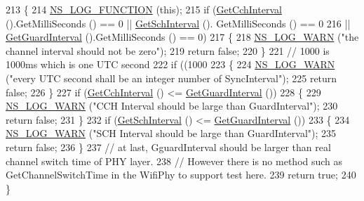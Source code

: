 \begin{DoxyCode}
213 \{
214   \hyperlink{log-macros-disabled_8h_a90b90d5bad1f39cb1b64923ea94c0761}{NS\_LOG\_FUNCTION} (\textcolor{keyword}{this});
215   \textcolor{keywordflow}{if} (\hyperlink{classns3_1_1ChannelCoordinator_a9716fda402d8768bf5488e7471c41eff}{GetCchInterval} ().GetMilliSeconds () == 0 || \hyperlink{classns3_1_1ChannelCoordinator_ac746b747df6aa82985ce5a7ac5ef77aa}{GetSchInterval} ().
      GetMilliSeconds () == 0
216       || \hyperlink{classns3_1_1ChannelCoordinator_a818fcbf14bd42870849b245540acacdb}{GetGuardInterval} ().GetMilliSeconds () == 0)
217     \{
218       \hyperlink{group__logging_gade7208b4009cdf0e25783cd26766f559}{NS\_LOG\_WARN} (\textcolor{stringliteral}{"the channel interval should not be zero"});
219       \textcolor{keywordflow}{return} \textcolor{keyword}{false};
220     \}
221   \textcolor{comment}{// 1000 is 1000ms which is one UTC second}
222   \textcolor{keywordflow}{if} ((1000 %
223     \{
224       \hyperlink{group__logging_gade7208b4009cdf0e25783cd26766f559}{NS\_LOG\_WARN} (\textcolor{stringliteral}{"every UTC second shall be an integer number of SyncInterval"});
225       \textcolor{keywordflow}{return} \textcolor{keyword}{false};
226     \}
227   \textcolor{keywordflow}{if} (\hyperlink{classns3_1_1ChannelCoordinator_a9716fda402d8768bf5488e7471c41eff}{GetCchInterval} () <= \hyperlink{classns3_1_1ChannelCoordinator_a818fcbf14bd42870849b245540acacdb}{GetGuardInterval} ())
228     \{
229       \hyperlink{group__logging_gade7208b4009cdf0e25783cd26766f559}{NS\_LOG\_WARN} (\textcolor{stringliteral}{"CCH Interval should be large than GuardInterval"});
230       \textcolor{keywordflow}{return} \textcolor{keyword}{false};
231     \}
232   \textcolor{keywordflow}{if} (\hyperlink{classns3_1_1ChannelCoordinator_ac746b747df6aa82985ce5a7ac5ef77aa}{GetSchInterval} () <= \hyperlink{classns3_1_1ChannelCoordinator_a818fcbf14bd42870849b245540acacdb}{GetGuardInterval} ())
233     \{
234       \hyperlink{group__logging_gade7208b4009cdf0e25783cd26766f559}{NS\_LOG\_WARN} (\textcolor{stringliteral}{"SCH Interval should be large than GuardInterval"});
235       \textcolor{keywordflow}{return} \textcolor{keyword}{false};
236     \}
237   \textcolor{comment}{// at last, GguardInterval should be larger than real channel switch time of PHY layer.}
238   \textcolor{comment}{// However there is no method such as GetChannelSwitchTime in the WifiPhy to support test here.}
239   \textcolor{keywordflow}{return} \textcolor{keyword}{true};
240 \}
\end{DoxyCode}



